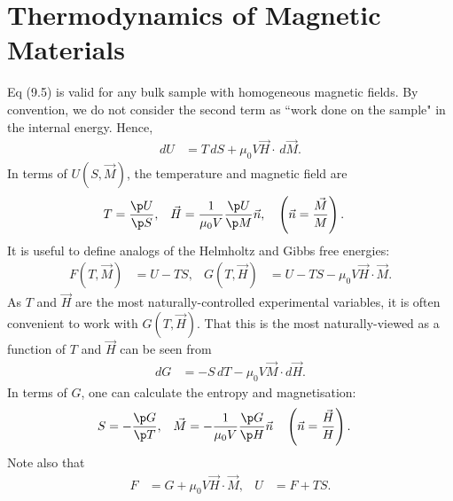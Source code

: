 \documentclass[a4paper, 11pt, normalem]{report}
\begin{document}
\section{Thermodynamics of Magnetic Materials}
Eq (9.5) is valid for any bulk sample with homogeneous magnetic fields.
By convention, we do not consider the second term as ``work done on the sample" in the internal energy.
Hence,
\begin{align}
    dU &= T\,dS + \mu_0V\vec{H}\cdot\,d\vec{M}.
\end{align}
In terms of $U(S,\vec{M})$, the temperature and magnetic field are
\begin{align}
    T &= \frac{\p U}{\p S}, & \vec{H} &= \frac{1}{\mu_0V}\frac{\p U}{\p M}\vec{n},\quad \left(\vec{n}=\frac{\vec{M}}{M}\right).
\end{align}
It is useful to define analogs of the Helmholtz and Gibbs free energies:
\begin{align}
    F(T,\vec{M}) &= U - TS, & G(T,\vec{H}) &= U-TS-\mu_0V\vec{H}\cdot\vec{M}.
\end{align}
As $T$ and $\vec{H}$ are the most naturally-controlled experimental variables, it is often convenient to work with $G(T,\vec{H})$.
That this is the most naturally-viewed as a function of $T$ and $\vec{H}$ can be seen from
\begin{align}
    dG &= -S\,dT - \mu_0V\vec{M}\cdot d\vec{H}.
\end{align}
In terms of $G$, one can calculate the entropy and magnetisation:
\begin{align}
    S &= -\frac{\p G}{\p T}, & \vec{M} &= -\frac{1}{\mu_0V}\frac{\p G}{\p H}\vec{n}\quad \left(\vec{n}=\frac{\vec{H}}{H}\right).
\end{align}
Note also that
\begin{align}
    F &= G+\mu_0V\vec{H}\cdot\vec{M}, & U &= F+TS.
\end{align}
\end{document}
